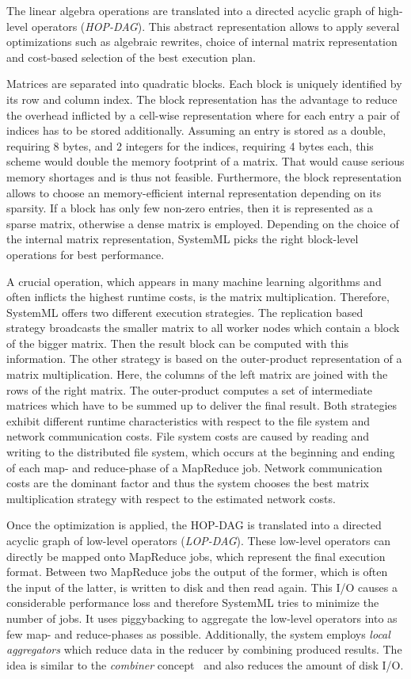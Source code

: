 The linear algebra operations are translated into a directed acyclic graph of high-level operators (\emph{HOP-DAG}).
This abstract representation allows to apply several optimizations such as algebraic rewrites, choice of internal matrix representation and cost-based selection of the best execution plan.

Matrices are separated into quadratic blocks.
Each block is uniquely identified by its row and column index.
The block representation has the advantage to reduce the overhead inflicted by a cell-wise representation where for each entry a pair of indices has to be stored additionally.
Assuming an entry is stored as a double, requiring 8 bytes, and 2 integers for the indices, requiring 4 bytes each, this scheme would double the memory footprint of a matrix.
That would cause serious memory shortages and is thus not feasible.
Furthermore, the block representation allows to choose an memory-efficient internal representation depending on its sparsity.
If a block has only few non-zero entries, then it is represented as a sparse matrix, otherwise a dense matrix is employed.
Depending on the choice of the internal matrix representation, SystemML picks the right block-level operations for best performance.

A crucial operation, which appears in many machine learning algorithms and often inflicts the highest runtime costs, is the matrix multiplication.
Therefore, SystemML offers two different execution strategies.
The replication based strategy broadcasts the smaller matrix to all worker nodes which contain a block of the bigger matrix.
Then the result block can be computed with this information.
The other strategy is based on the outer-product representation of a matrix multiplication.
Here, the columns of the left matrix are joined with the rows of the right matrix.
The outer-product computes a set of intermediate matrices which have to be summed up to deliver the final result.
Both strategies exhibit different runtime characteristics with respect to the file system and network communication costs.
File system costs are caused by reading and writing to the distributed file system, which occurs at the beginning and ending of each map- and reduce-phase of a MapReduce job.
Network communication costs are the dominant factor and thus the system chooses the best matrix multiplication strategy with respect to the estimated network costs.

Once the optimization is applied, the HOP-DAG is translated into a directed acyclic graph of low-level operators (\emph{LOP-DAG}).
These low-level operators can directly be mapped onto MapReduce jobs, which represent the final execution format.
Between two MapReduce jobs the output of the former, which is often the input of the latter, is written to disk and then read again.
This I/O causes a considerable performance loss and therefore SystemML tries to minimize the number of jobs.
It uses piggybacking to aggregate the low-level operators into as few map- and reduce-phases as possible.
Additionally, the system employs \emph{local aggregators} which reduce data in the reducer by combining produced results.
The idea is similar to the \emph{combiner} concept~\cite{dean:c2008a} and also reduces the amount of disk I/O.

